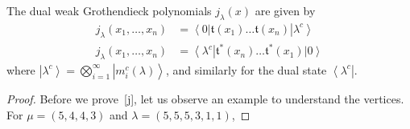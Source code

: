 \documentclass[ALCO, Unicode]{cedram}
\newcommand{\bra}[1]{\left\langle #1\right|}
\newcommand{\ket}[1]{\left|#1\right\rangle}
\newcommand\jt{{\mathfrak t}}
\begin{document}
\begin{thm}
\label{thm:j}
The dual weak Grothendieck polynomials $j_{\lambda}(x)$  are given by
%
\begin{align}
\label{j}
j_{\lambda}(x_1,\dots,x_n)
&=
\bra{0}
\jt(x_1)
\dots
\jt(x_n)
\ket{\lambda^c}
\\
\label{dj}
j_{\lambda}(x_1,\dots,x_n)
&=
\bra{\lambda^c}
\jt^{*}(x_n)
\dots
\jt^{*}(x_1)
\ket{0}
\end{align}
%
where $\ket{\lambda^c} = \bigotimes_{i=1}^{\infty} \ket{m^c_i(\lambda)}$, and similarly for the dual state $\bra{\lambda^c}$.
\end{thm}

\begin{proof}
Before we prove~\eqref{j}, let us observe an example to understand the vertices.
For $\mu=(5,4,4,3)$ and $\lambda=(5,5,5,3,1,1)$,



\end{proof}
\end{document}

